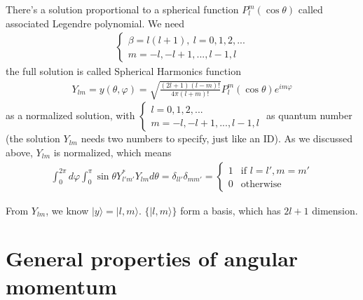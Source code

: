 \documentclass[UTF8,12pt]{article} %
\numberwithin{equation}{section}
\begin{document}
There's a solution proportional to a spherical function $P_{l}^{m}(\cos\theta)$ called associated Legendre polynomial. We need
\begin{align}
\begin{cases}
\beta = l(l+1),~ l = 0,1,2,... \\
m = -l, -l+1, ..., l-1, l
\end{cases}
\end{align}
the full solution is called Spherical Harmonics function
\begin{align}
Y_{lm} = y(\theta,\varphi) = \sqrt{\frac{(2l+1)(l-m)!}{4\pi(l+m)!}}P_{l}^{m}(\cos\theta) e^{im\varphi}
\end{align}
as a normalized solution, with $\begin{cases}l = 0,1,2,...\\m = -l, -l+1,..., l-1, l\end{cases}$ as quantum number (the solution $Y_{lm}$ needs two numbers to specify, just like an ID). As we discussed above, $Y_{lm}$ is normalized, which means
\begin{align}
\int_{0}^{2\pi} d\varphi \int_{0}^{\pi} \sin\theta Y_{l'm'}^{*} Y_{lm} d\theta = \delta_{ll'}\delta_{mm'} = \begin{cases}1&\text{if }l=l', m=m'\\0&\text{otherwise}\end{cases}
\end{align}

From $Y_{lm}$, we know $|y\rangle = |l,m\rangle$. $\{|l,m\rangle\}$ form a basis, which has $2l + 1$ dimension.

\section{General properties of angular momentum}
\end{document}

